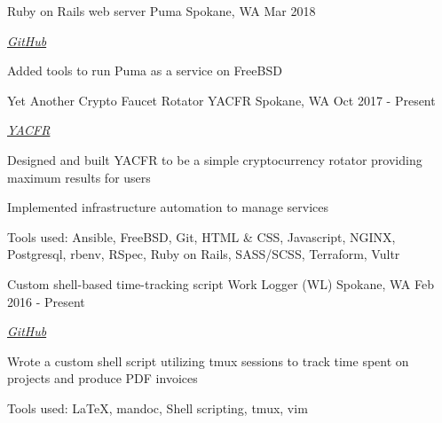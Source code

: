 

\begin{cventries}

  \cventry
    {Ruby on Rails web server} %
    {Puma} %
    {Spokane, WA} %
    {Mar 2018} %
    {
      \begin{cvitems} %
        \item {\emph{\href{https://github.com/puma/puma/tree/master/tools/jungle/rc.d}{GitHub}}}
        \item {Added tools to run Puma as a service on FreeBSD}
      \end{cvitems}
    }

  \cventry
    {Yet Another Crypto Faucet Rotator} %
    {YACFR} %
    {Spokane, WA} %
    {Oct 2017 - Present} %
    {
      \begin{cvitems} %
        \item {\emph{\href{https://yacfr.com}{YACFR}}}
        \item {Designed and built YACFR to be a simple cryptocurrency rotator providing maximum results for users}
        \item {Implemented infrastructure automation to manage services}
        \item {Tools used: Ansible, FreeBSD, Git, HTML \& CSS, Javascript, NGINX, Postgresql, rbenv, RSpec, Ruby on Rails, SASS/SCSS, Terraform, Vultr}
      \end{cvitems}
    }

  \cventry
    {Custom shell-based time-tracking script} %
    {Work Logger (WL)} %
    {Spokane, WA} %
    {Feb 2016 - Present} %
    {
      \begin{cvitems} %
        \item {\emph{\href{https://github.com/desnudopenguino/wl}{GitHub}}}
        \item {Wrote a custom shell script utilizing tmux sessions to track time spent on projects and produce PDF invoices}
        \item {Tools used: LaTeX, mandoc, Shell scripting, tmux, vim}
      \end{cvitems}
    }


\end{cventries}
